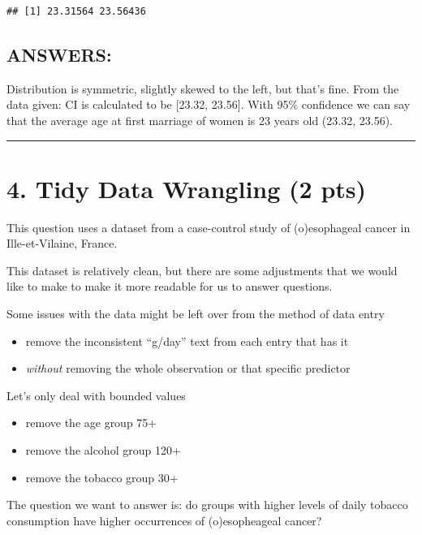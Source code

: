 \documentclass[
]{article}
\providecommand{\tightlist}{%
  \setlength{\itemsep}{0pt}\setlength{\parskip}{0pt}}
\begin{document}
\begin{verbatim}
## [1] 23.31564 23.56436
\end{verbatim}

\hypertarget{answers}{%
\subsection{ANSWERS:}\label{answers}}

Distribution is symmetric, slightly skewed to the left, but that's fine.
From the data given: CI is calculated to be {[}23.32, 23.56{]}. With
95\% confidence we can say that the average age at first marriage of
women is 23 years old (23.32, 23.56).

\begin{center}\rule{0.5\linewidth}{0.5pt}\end{center}

\hypertarget{tidy-data-wrangling-2-pts}{%
\section{4. Tidy Data Wrangling (2
pts)}\label{tidy-data-wrangling-2-pts}}

This question uses a dataset from a case-control study of (o)esophageal
cancer in Ille-et-Vilaine, France.

This dataset is relatively clean, but there are some adjustments that we
would like to make to make it more readable for us to answer questions.

Some issues with the data might be left over from the method of data
entry

\begin{itemize}
\tightlist
\item
  remove the inconsistent ``g/day'' text from each entry that has it
\item
  \emph{without} removing the whole observation or that specific
  predictor
\end{itemize}

Let's only deal with bounded values

\begin{itemize}
\tightlist
\item
  remove the age group 75+
\item
  remove the alcohol group 120+
\item
  remove the tobacco group 30+
\end{itemize}

The question we want to answer is: do groups with higher levels of daily
tobacco consumption have higher occurrences of (o)esopheageal cancer?
\end{document}
